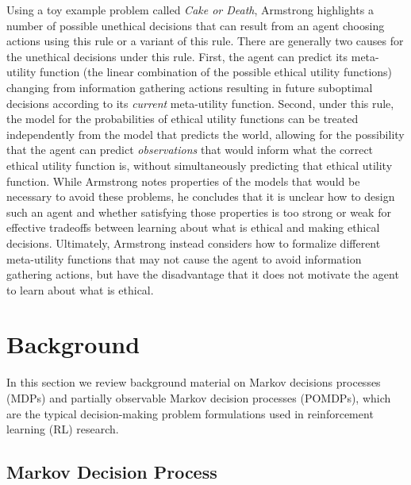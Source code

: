 \documentclass[11pt]{article}
\begin{document}
Using a toy example problem called {\em Cake or Death}, Armstrong highlights a number of possible unethical decisions that can result from an agent choosing actions using this rule or a variant of this rule. There are generally two causes for the unethical decisions under this rule. First, the agent can predict its meta-utility function (the linear combination of the possible ethical utility functions) changing from information gathering actions resulting in future suboptimal decisions according to its {\em current} meta-utility function. Second, under this rule, the model for the probabilities of ethical utility functions can be treated independently from the model that predicts the world, allowing for the possibility that the agent can predict {\em observations} that would inform what the correct ethical utility function is, without simultaneously predicting that ethical utility function. While Armstrong notes properties of the models that would be necessary to avoid these problems, he concludes that it is unclear how to design such an agent and whether satisfying those properties is too strong or weak for effective tradeoffs between learning about what is ethical and making ethical decisions. Ultimately, Armstrong instead considers how to formalize different meta-utility functions that may not cause the agent to avoid information gathering actions, but have the disadvantage that it does not motivate the agent to learn about what is ethical.



\section{Background}

In this section we review background material on Markov decisions processes (MDPs) and partially observable Markov decision processes (POMDPs), which are the typical decision-making problem formulations used in reinforcement learning (RL) research.

\subsection{Markov Decision Process}
\end{document}
